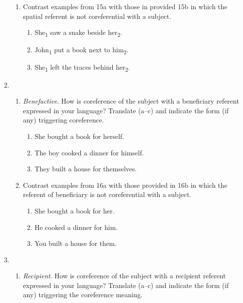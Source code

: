\documentclass[output=paper]{langscibook}
\begin{document}
\begin{enumerate}[resume]
\begin{enumerate}[label=(\alph*)]
\item Contrast examples from {15a} with those in provided {15b} in which the spatial referent is not coreferential with a subject.

    \begin{enumerate}[label=\alph*.]
    \item She\textsubscript{1} saw a snake beside her\textsubscript{2}. 
    \item John\textsubscript{1} put a book next to him\textsubscript{2}. 
    \item She\textsubscript{1} left the traces behind her\textsubscript{2}. 
    \end{enumerate}

\end{enumerate}


\item \begin{enumerate}[label=(\alph*)] 
  \item \textit{Benefactive}. How is coreference of the subject with a beneficiary referent expressed in your language? Translate (a--c) and indicate the form (if any) triggering coreference. 
  \begin{enumerate}[label=\alph*.]
    \item She bought a book for herself. 
    \item The boy cooked a dinner for himself. 
    \item They built a house for themselves. 
   \end{enumerate}

  \item Contrast examples from {16a} with those provided in {16b} in which the referent of beneficiary is not coreferential with a subject.

  \begin{enumerate}[label=\alph*.]
  \item  She bought a book for her. 
  \item  He cooked a dinner for him. 
  \item  You built a house for them. 
  \end{enumerate}
  \end{enumerate}

\item \begin{enumerate}[label=(\alph*)] 
    \item \textit{Recipient}. How is coreference of the subject with a recipient referent expressed in your language? Translate (a--c) and indicate the form (if any) triggering the coreference meaning. 


\end{enumerate}
\end{enumerate}
\end{document}

